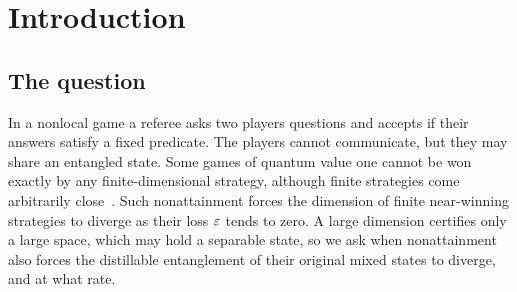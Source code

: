 \section{Introduction}\label{sec:intro}

\subsection{The question}\label{sec:intro-question}

In a nonlocal game a referee asks two players questions and accepts if their answers satisfy a fixed predicate. The players
cannot communicate, but they may share an entangled state. Some games of quantum value one cannot be won exactly by any
finite-dimensional strategy, although finite strategies come arbitrarily close~\cite{Slo19}. Such nonattainment forces the
dimension of finite near-winning strategies to diverge as their loss $\varepsilon$ tends to zero. A large dimension certifies only a
large space, which may hold a separable state, so we ask when nonattainment also forces the distillable entanglement of their
original mixed states to diverge, and at what rate.

